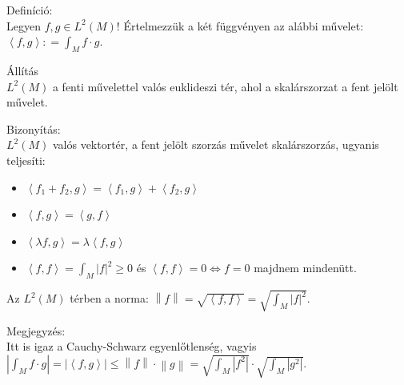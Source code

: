 \documentclass[12pt,a4paper]{scrartcl}
\providecommand{\tightlist}{%
  \setlength{\itemsep}{0pt}\setlength{\parskip}{0pt}}
\newenvironment{definicio}{}{}
\newenvironment{bizonyitas}{}{}
\newenvironment{allitas}{}{}
\newenvironment{megjegyzes}{}{}
\begin{document}
\begin{definicio}

Definíció:\\
Legyen \(f,g \in L^{2}\left( M \right)\)! Értelmezzük a két függvényen
az alábbi művelet:
\(\left\langle {f,g} \right\rangle: = {\int_{M}{f \cdot g}}\).

\end{definicio}

\begin{allitas}

Állítás\\
\(L^{2}\left( M \right)\) a fenti művelettel valós euklideszi tér, ahol
a skalárszorzat a fent jelölt művelet.

\end{allitas}

\begin{bizonyitas}

Bizonyítás:\\
\(L^{2}\left( M \right)\) valós vektortér, a fent jelölt szorzás művelet
skalárszorzás, ugyanis teljesíti:

\begin{itemize}
\tightlist
\item
  \(\left\langle {f_{1} + f_{2},g} \right\rangle = \left\langle {f_{1},g} \right\rangle + \left\langle {f_{2},g} \right\rangle\)
\item
  \(\left\langle {f,g} \right\rangle = \left\langle {g,f} \right\rangle\)
\item
  \(\left\langle {\lambda f,g} \right\rangle = \lambda\left\langle {f,g} \right\rangle\)
\item
  \(\left\langle {f,f} \right\rangle = {\int_{M}\left| f \right|^{2}} \geq 0\)
  és
  \(\left. \left\langle {f,f} \right\rangle = 0\Leftrightarrow f = 0 \right.\)
  majdnem mindenütt.
\end{itemize}

\end{bizonyitas}

Az \(L^{2}\left( M \right)\) térben a norma:
\(\left\| f \right\| = \sqrt{\left\langle {f,f} \right\rangle} = \sqrt{\int_{M}\left| f \right|^{2}}\).

\begin{megjegyzes}

Megjegyzés:\\
Itt is igaz a Cauchy-Schwarz egyenlőtlenség, vagyis
\(\left| {\int_{M}{f \cdot g}} \right| = \left| \left\langle {f,g} \right\rangle \right| \leq \left\| f \right\| \cdot \left\| g \right\| = \sqrt{\int_{M}\left| f^{2} \right|} \cdot \sqrt{\int_{M}\left| g^{2} \right|}\).

\end{megjegyzes}
\end{document}
